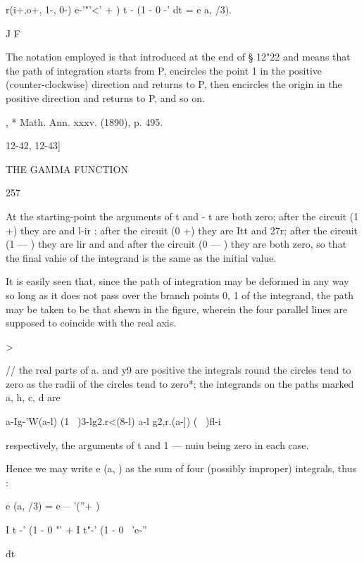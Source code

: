 r(i+,o+, 1-, 0-) e-'"'<' + ) t - (1 - 0 -' dt = e a, /3).

J F

The notation employed is that introduced at the end of § 12"22 and
means that the path of integration starts from P, encircles the point
1 in the positive (counter-clockwise) direction and returns to P, then
encircles the origin in the positive direction and returns to P, and
so on.

, * Math. Ann. xxxv. (1890), p. 495.



12-42, 12-43]



THE GAMMA FUNCTION



257



At the starting-point the arguments of t and - t are both zero; after
the circuit (1 +) they are and l-ir ; after the circuit (0 +) they are
Itt and 27r; after the circuit (1 — ) they are lir and and after the
circuit (0 — ) they are both zero, so that the final vahie of the
integrand is the same as the initial value.

It is easily seen that, since the path of integration may be deformed
in any way so long as it does not pass over the branch points 0, 1 of
the integrand, the path may be taken to be that shewn in the figure,
wherein the four parallel lines are supposed to coincide with the real
axis.




>




// the real parts of a. and y9 are positive the integrals round the
circles tend to zero as the radii of the circles tend to zero*; the
integrands on the paths marked a, h, c, d are

 a-Ig-'W(a-l) (1 \ )3-lg2.r<(8-l) a-l g2,r.(a-]) ( \ )fl-i

respectively, the arguments of t and 1 — nuiu being zero in each case.

Hence we may write e (a, ) as the sum of four (possibly improper)
integrals, thus :



e (a, /3) = e— '(''+ )



I t -' (1 - 0 "' + I t"-' (1 - 0 ~'e-''



 dt



